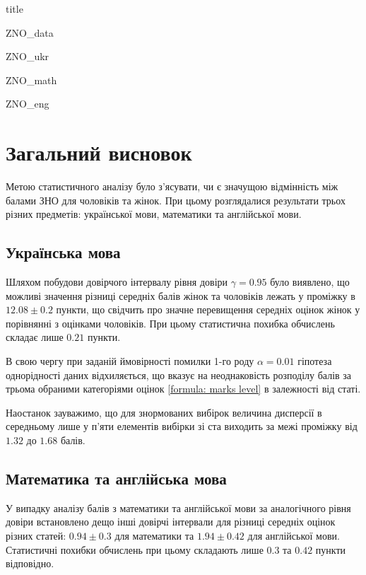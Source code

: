 \documentclass[a4paper,14pt]{extarticle} %
\numberwithin{equation}{section}
\begin{document}
{title}

\tableofcontents

\newpage
{ZNO_data}

\newpage
{ZNO_ukr}

\newpage
{ZNO_math}

\newpage
{ZNO_eng}

\newpage
\section*{Загальний висновок}

Метою статистичного аналізу було з'ясувати, чи є значущою відмінність між балами ЗНО для чоловіків 
та жінок. При цьому розглядалися результати трьох різних предметів: української мови, математики та 
англійської мови.

\subsection*{Українська мова}

Шляхом побудови довірчого інтервалу рівня довіри $\gamma=0.95$ було виявлено, що можливі значення різниці середніх балів 
жінок та чоловіків лежать у проміжку в $12.08\pm 0.2$ пункти, що свідчить про значне перевищення середніх
оцінок жінок у порівнянні з оцінками чоловіків. При цьому статистична похибка обчислень складає лише $0.21$ 
пункти. 

В свою чергу при заданій ймовірності помилки 1-го роду $\alpha=0.01$ гіпотеза однорідності даних відхиляється, 
що вказує на неоднаковість розподілу балів за трьома обраними категоріями оцінок \eqref{formula: marks level} 
в залежності від статі.

Наостанок зауважимо, що для знормованих вибірок величина дисперсії в середньому лише у п'яти 
елементів вибірки зі ста виходить за межі проміжку від $1.32$ до $1.68$ балів.

\subsection*{Математика та англійська мова}

У випадку аналізу балів з математики та англійської мови за аналогічного рівня довіри встановлено дещо інші 
довірчі інтервали для різниці середніх оцінок різних статей: $0.94\pm 0.3$ для математики та $1.94\pm 0.42$ 
для англійської мови. Статистичні похибки обчислень при цьому складають лише $0.3$ та $0.42$ пункти відповідно. 
\end{document}
